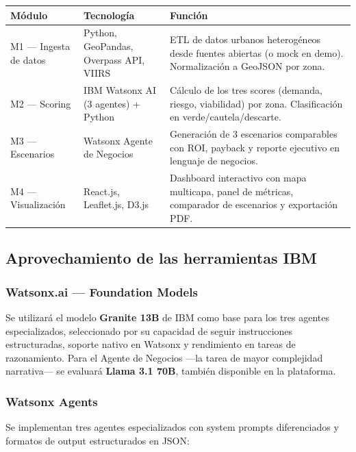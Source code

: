 \documentclass[12pt,a4paper]{article}
\begin{document}
\begin{table}[H]
\centering
\small
\renewcommand{\arraystretch}{1.3}
\begin{tabularx}{\textwidth}{l l X}
\toprule
\rowcolor{grisoscuro}
\color{white}\textbf{Módulo} & \color{white}\textbf{Tecnología} & \color{white}\textbf{Función} \\
\midrule
M1 — Ingesta de datos & Python, GeoPandas, Overpass API, VIIRS & ETL de datos urbanos heterogéneos desde fuentes abiertas (o mock en demo). Normalización a GeoJSON por zona. \\
\rowcolor{fondofila}
M2 — Scoring & IBM Watsonx AI (3 agentes) + Python & Cálculo de los tres scores (demanda, riesgo, viabilidad) por zona. Clasificación en verde/cautela/descarte. \\
M3 — Escenarios & Watsonx Agente de Negocios & Generación de 3 escenarios comparables con ROI, payback y reporte ejecutivo en lenguaje de negocios. \\
\rowcolor{fondofila}
M4 — Visualización & React.js, Leaflet.js, D3.js & Dashboard interactivo con mapa multicapa, panel de métricas, comparador de escenarios y exportación PDF. \\
\bottomrule
\end{tabularx}
\end{table}

\subsection{Aprovechamiento de las herramientas IBM}

\subsubsection{Watsonx.ai — Foundation Models}

Se utilizará el modelo \textbf{Granite 13B} de IBM como base para los tres agentes especializados, seleccionado por su capacidad de seguir instrucciones estructuradas, soporte nativo en Watsonx y rendimiento en tareas de razonamiento. Para el Agente de Negocios —la tarea de mayor complejidad narrativa— se evaluará \textbf{Llama 3.1 70B}, también disponible en la plataforma.

\subsubsection{Watsonx Agents}

Se implementan tres agentes especializados con system prompts diferenciados y formatos de output estructurados en JSON:
\end{document}
